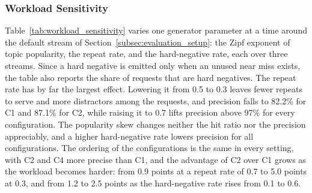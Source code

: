 \documentclass[authoryear,preprint,review,12pt]{elsarticle}
\begin{document}
\subsubsection{Workload Sensitivity}
\label{subsubsec:workload_sensitivity}
Table~\ref{tab:workload_sensitivity} varies one generator parameter at a time around the default stream of Section~\ref{subsec:evaluation_setup}: the Zipf exponent of topic popularity, the repeat rate, and the hard-negative rate, each over three streams. Since a hard negative is emitted only when an unused near miss exists, the table also reports the share of requests that are hard negatives. The repeat rate has by far the largest effect. Lowering it from 0.5 to 0.3 leaves fewer repeats to serve and more distractors among the requests, and precision falls to 82.2\% for C1 and 87.1\% for C2, while raising it to 0.7 lifts precision above 97\% for every configuration. The popularity skew changes neither the hit ratio nor the precision appreciably, and a higher hard-negative rate lowers precision for all configurations. The ordering of the configurations is the same in every setting, with C2 and C4 more precise than C1, and the advantage of C2 over C1 grows as the workload becomes harder: from 0.9 points at a repeat rate of 0.7 to 5.0 points at 0.3, and from 1.2 to 2.5 points as the hard-negative rate rises from 0.1 to 0.6.

\begin{table}[htbp]
\centering
\caption{Sensitivity to workload composition: served-hit ratio / hit precision (\%), mean over three streams (seeds 42--44). One generator parameter varies at a time from the default stream (Zipf exponent 1.1, repeat rate 0.5, hard-negative rate 0.35); the hard-negative column gives the realized share of requests.}
\label{tab:workload_sensitivity}
\end{table}
\end{document}
